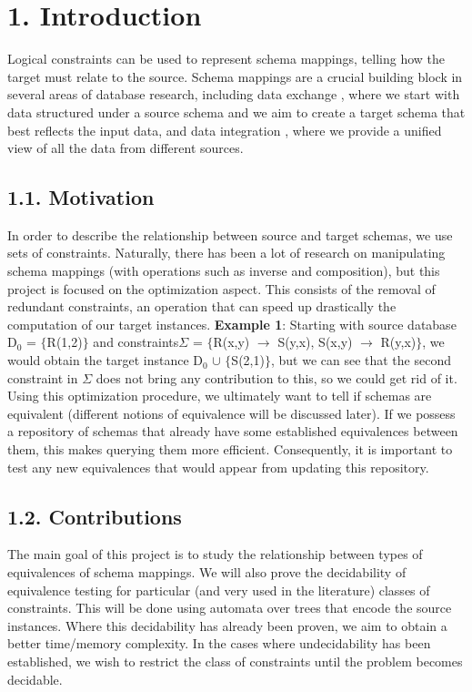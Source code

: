 \documentclass[11pt, a4paper, dvipsnames]{article}
\begin{document}
\newpage

\setcounter{secnumdepth}{-1}
\setcounter{tocdepth}{2}
\tableofcontents

\newpage

\section{1. Introduction}
Logical constraints can be used to represent schema mappings, telling how the target must relate to the source. Schema mappings are a crucial building block in several areas of database research, including data exchange \cite{dataexchange}, where we start with data structured under a source schema and we aim to create a target schema that best reflects the input data, and data integration \cite{dataintegration}, where we provide a unified view of all the data from different sources.

\subsection{1.1. Motivation}
In order to describe the relationship between source and target schemas, we use sets of constraints. Naturally, there has been a lot of research on manipulating schema mappings (with operations such as inverse and composition), but this project is focused on the optimization aspect. This consists of the removal of redundant constraints, an operation that can speed up drastically the computation of our target instances. \newline
\textbf{Example 1}: Starting with source database D$_{0}$ = $\{$R(1,2)$\}$ and constraints\newline $\Sigma$ = $\{$R(x,y) $\rightarrow$ S(y,x), S(x,y) $\rightarrow$ R(y,x)$\}$, we would obtain the target instance D$_{0}$ $\cup$ $\{$S(2,1)$\}$, but we can see that the second constraint in $\Sigma$ does not bring any contribution to this, so we could get rid of it.\newline
Using this optimization procedure, we ultimately want to tell if schemas are equivalent (different notions of equivalence will be discussed later). If we possess a repository of schemas that already have some established equivalences between them, this makes querying them more efficient. Consequently, it is important to test any new equivalences that would appear from updating this repository. 

\subsection{1.2. Contributions}
The main goal of this project is to study the relationship between types of equivalences of schema mappings. We will also prove the decidability of equivalence testing for particular (and very used in the literature) classes of constraints. This will be done using automata over trees that encode the source instances. Where this decidability has already been proven, we aim to obtain a better time/memory complexity. In the cases where undecidability has been established, we wish to restrict the class of constraints until the problem becomes decidable. 
\end{document}
